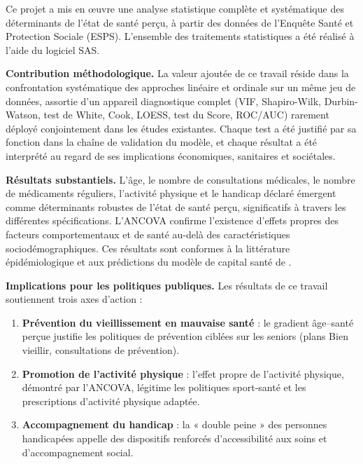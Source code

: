 \documentclass[11pt,a4paper]{memoirerecherche}
\providecommand{\tightlist}{%
  \setlength{\itemsep}{0pt}\setlength{\parskip}{0pt}}
\begin{document}
Ce projet a mis en œuvre une analyse statistique complète et systématique des déterminants de l'état de santé perçu, à partir des données de l'Enquête Santé et Protection Sociale (ESPS). L'ensemble des traitements statistiques a été réalisé à l'aide du logiciel SAS.

\textbf{Contribution méthodologique.} La valeur ajoutée de ce travail réside dans la confrontation systématique des approches linéaire et ordinale sur un même jeu de données, assortie d'un appareil diagnostique complet (VIF, Shapiro-Wilk, Durbin-Watson, test de White, Cook, LOESS, test du Score, ROC/AUC) rarement déployé conjointement dans les études existantes. Chaque test a été justifié par sa fonction dans la chaîne de validation du modèle, et chaque résultat a été interprété au regard de ses implications économiques, sanitaires et sociétales.

\textbf{Résultats substantiels.} L'âge, le nombre de consultations médicales, le nombre de médicaments réguliers, l'activité physique et le handicap déclaré émergent comme déterminants robustes de l'état de santé perçu, significatifs à travers les différentes spécifications. L'ANCOVA confirme l'existence d'effets propres des facteurs comportementaux et de santé au-delà des caractéristiques sociodémographiques. Ces résultats sont conformes à la littérature épidémiologique \autocites[ ]{mackenbach1999}[ ]{marmot2005}{singh2006} et aux prédictions du modèle de capital santé de \textcite{grossman1972}.

\textbf{Implications pour les politiques publiques.} Les résultats de ce travail soutiennent trois axes d'action :

\begin{enumerate}
\def\labelenumi{\arabic{enumi}.}
\tightlist
\item
  \textbf{Prévention du vieillissement en mauvaise santé} : le gradient âge--santé perçue justifie les politiques de prévention ciblées sur les seniors (plans Bien vieillir, consultations de prévention).
\item
  \textbf{Promotion de l'activité physique} : l'effet propre de l'activité physique, démontré par l'ANCOVA, légitime les politiques sport-santé et les prescriptions d'activité physique adaptée.
\item
  \textbf{Accompagnement du handicap} : la « double peine » des personnes handicapées appelle des dispositifs renforcés d'accessibilité aux soins et d'accompagnement social.
\end{enumerate}
\end{document}
